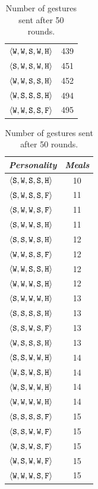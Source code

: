 \begin{table}
{{\begin{minipage}[b]{0.42\hsize}
\begin{tabular}{ l | c }
						$\personality{W}{W}{S}{W}{H}$ & 439\\
						$\personality{S}{W}{S}{W}{H}$ & 451\\
						$\personality{W}{W}{S}{S}{H}$ & 452\\
						$\personality{W}{S}{S}{S}{H}$ & 494\\
						$\personality{W}{W}{S}{S}{F}$ & 495\\
				\end{tabular}
				\caption{Number of gestures sent after 50 rounds.}
				\label{tab:numGestures}
			\end{minipage}
			\hfill
			\begin{minipage}[b]{0.42\hsize}\centering
				\begin{tabular}{ l | c }
					\emph{Personality} & \emph{Meals} \\
					\hline
						$\personality{S}{W}{S}{S}{H}$ & 10\\
						$\personality{S}{W}{S}{S}{F}$ & 11\\
						$\personality{S}{W}{W}{S}{F}$ & 11\\
						$\personality{S}{W}{W}{S}{H}$ & 11\\
						$\personality{S}{S}{W}{S}{H}$ & 12\\
						$\personality{W}{W}{S}{S}{F}$ & 12\\
						$\personality{W}{W}{S}{S}{H}$ & 12\\
						$\personality{W}{W}{W}{S}{H}$ & 12\\
						$\personality{S}{W}{W}{W}{H}$ & 13\\
						$\personality{S}{S}{S}{S}{H}$ & 13\\
						$\personality{S}{S}{W}{S}{F}$ & 13\\
						$\personality{W}{S}{S}{S}{H}$ & 13\\
						$\personality{S}{S}{W}{W}{H}$ & 14\\
						$\personality{W}{S}{W}{S}{H}$ & 14\\
						$\personality{W}{S}{W}{W}{H}$ & 14\\
						$\personality{W}{W}{W}{W}{H}$ & 14\\
						$\personality{S}{S}{S}{S}{F}$ & 15\\
						$\personality{S}{S}{W}{W}{F}$ & 15\\
						$\personality{W}{S}{W}{S}{F}$ & 15\\
						$\personality{W}{S}{W}{W}{F}$ & 15\\
						$\personality{W}{W}{W}{S}{F}$ & 15\\

\end{tabular}
\end{minipage}}}
\end{table}
